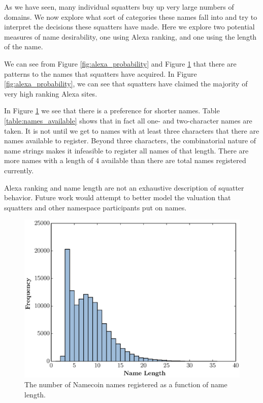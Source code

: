 As we have seen, many individual squatters buy up very large numbers of domains. We now explore what sort of categories these names fall into and try to interpret the decisions these squatters have made. Here we explore two potential measures of name desirability, one using Alexa ranking, and one using the length of the name.

We can see from Figure \ref{fig:alexa_probability} and Figure \ref{fig:name_length_histogram} that there are patterns to the names that squatters have acquired. In Figure \ref{fig:alexa_probability}, we can see that squatters have claimed the majority of very high ranking Alexa sites.

In Figure \ref{fig:name_length_histogram} we see that there is a preference for shorter names. Table \ref{table:names_available} shows that in fact all one- and two-character names are taken. It is not until we get to names with at least three characters that there are names available to register. Beyond three characters, the combinatorial nature of name strings makes it infeasible to register all names of that length. There are more names with a length of 4 available than there are total names registered currently.

Alexa ranking and name length are not an exhaustive description of squatter behavior. Future work would attempt to better model the valuation that squatters and other namespace participants put on names.


\begin{figure}
  \centering
  \includegraphics[width=\columnwidth]{figures/name_length_histogram}
  \caption{The number of Namecoin names registered as a function of name length.}
  \label{fig:name_length_histogram}
\end{figure}

